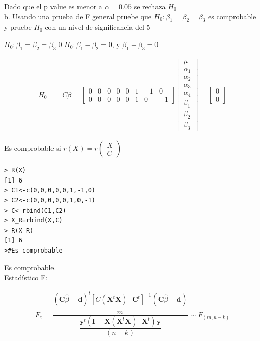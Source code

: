 \documentclass[12pt,a4paper]{report}
\begin{document}
Dado que el p value es menor a $\alpha=0.05$ se rechaza $H_0$\\ 




 b. Usando una prueba de F general pruebe que $H_0 : \beta_1 = \beta_2 = \beta_3$ es comprobable y pruebe $H_0$ con un nivel de significancia del 5%

$H_0 : \beta_1 = \beta_2 = \beta_3$ 0 $H_0 : \beta_1 - \beta_2 =0$, y $\beta_1 - \beta_3 =0$


\begin{align*}
H_0&=C\beta=
\begin{bmatrix}0 & 0 & 0 & 0 & 0 & 1 & -1 & 0\\
               0 & 0 & 0 & 0 & 0 & 1 & 0 & -1
\end{bmatrix}
\begin{bmatrix} \mu \\ \alpha_1 \\ \alpha_2 \\ \alpha_3 \\ \alpha_4 \\ \beta_1 \\ \beta_2 \\ \beta_3
\end{bmatrix}=
\begin{bmatrix} 0 \\
                0
\end{bmatrix}
\end{align*}

Es comprobable si $r(X)=r\begin{pmatrix} X \\ C \end{pmatrix}$

\begin{verbatim}
> R(X)
[1] 6
> C1<-c(0,0,0,0,0,1,-1,0)
> C2<-c(0,0,0,0,0,1,0,-1)
> C<-rbind(C1,C2)
> X_R=rbind(X,C)
> R(X_R)
[1] 6
>#Es comprobable
\end{verbatim}

Es comprobable.\\

Estadístico F:


\begin{align*}
F_c=\dfrac{\dfrac{(\mathbf{C}\hat{\beta}-\mathbf{d})^t[C(\mathbf{X}^t\mathbf{X})^{-}\mathbf{C}^t]^{-1}(\mathbf{C}\hat{\beta}-\mathbf{d})}{m}}{\dfrac{\mathbf{y}^t(\mathbf{I}-\mathbf{X}(\mathbf{X}^t\mathbf{X})^{-}\mathbf{X}^t)\mathbf{y}}{(n-k)}} \sim F_{(m,n-k)}
\end{align*}
\end{document}
